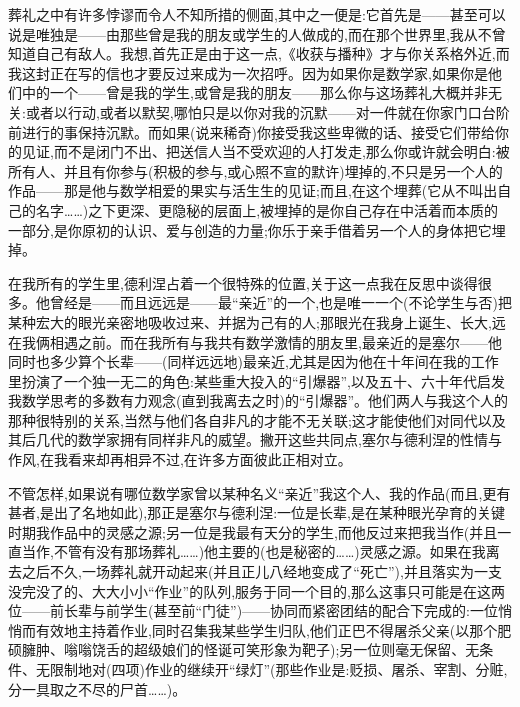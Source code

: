 \pmark 葬礼之中有许多悖谬而令人不知所措的侧面,其中之一便是:它首先是——甚至可以说是唯独是——由那些曾是我的朋友或学生的人做成的,而在那个世界里,我从不曾知道自己有敌人。我想,首先正是由于这一点,《收获与播种》才与你关系格外近,而我这封正在写的信也才要反过来成为一次招呼。因为如果你是数学家,如果你是他们中的一个——曾是我的学生,或曾是我的朋友——那么你与这场葬礼大概并非无关:或者以行动,或者以默契,哪怕只是以你对我的沉默——对一件就在你家门口台阶前进行的事保持沉默。而如果(说来稀奇)你接受我这些卑微的话、接受它们带给你的见证,而不是闭门不出、把送信人当不受欢迎的人打发走,那么你或许就会明白:被所有人、并且有你参与(积极的参与,或心照不宣的默许)埋掉的,不只是另一个人的作品——那是他与数学相爱的果实与活生生的见证;而且,在这个埋葬(它从不叫出自己的名字……)之下更深、更隐秘的层面上,被埋掉的是你自己存在中活着而本质的一部分,是你原初的认识、爱与创造的力量;你乐于亲手借着另一个人的身体把它埋掉。

在我所有的学生里,德利涅占着一个很特殊的位置,关于这一点我在反思中谈得很多。他曾经是——而且远远是——最“亲近”的一个,也是唯一一个(不论学生与否)把某种宏大的眼光亲密地吸收过来、并据为己有的人;那眼光在我身上诞生、长大,远在我俩相遇之前。而在我所有与我共有数学激情的朋友里,最亲近的是塞尔——他同时也多少算个长辈——(同样远远地)最亲近,尤其是因为他在十年间在我的工作里扮演了一个独一无二的角色:某些重大投入的“引爆器”,以及五十、六十年代启发我数学思考的多数有力观念(直到我离去之时)的“引爆器”。他们两人与我这个人的那种很特别的关系,当然与他们各自非凡的才能不无关联;这才能使他们对同代以及其后几代的数学家拥有同样非凡的威望。撇开这些共同点,塞尔与德利涅的性情与作风,在我看来却再相异不过,在许多方面彼此正相对立。

不管怎样,如果说有哪位数学家曾以某种名义“亲近”我这个人、我的作品(而且,更有甚者,是出了名地如此),那正是塞尔与德利涅:一位是长辈,是在某种眼光孕育的关键时期我作品中的灵感之源;另一位是我最有天分的学生,而他反过来把我当作(并且一直当作,不管有没有那场葬礼……)他主要的(也是秘密的……)灵感之源。如果在我离去之后不久,一场葬礼就开动起来(并且正儿八经地变成了“死亡”),并且落实为一支没完没了的、大大小小“作业”的队列,服务于同一个目的,那么这事只可能是在这两位——前长辈与前学生(甚至前“门徒”)——协同而紧密团结的配合下完成的:一位悄悄而有效地主持着作业,同时召集我某些学生归队,他们正巴不得屠杀父亲(以那个肥硕臃肿、嗡嗡饶舌的超级娘们的怪诞可笑形象为靶子);另一位则毫无保留、无条件、无限制地对(四项)作业的继续开“绿灯”(那些作业是:贬损、屠杀、宰割、分赃,分一具取之不尽的尸首……)。

